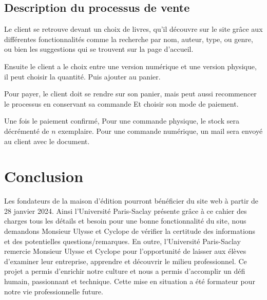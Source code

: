 \documentclass[14pt]{extarticle}
\begin{document}
\subsection{Description du processus de vente}
Le client se retrouve devant un choix de livres, qu’il découvre sur le site grâce aux différentes fonctionnalités comme la recherche par nom, auteur, type, ou genre, ou bien les suggestions qui se trouvent sur la page d’accueil.

Ensuite le client a le choix entre une version numérique et une version physique, il peut choisir la quantité. Puis ajouter au panier.

Pour payer, le client doit se rendre sur son panier, mais peut aussi recommencer le processus en conservant sa commande
Et choisir son mode de paiement.

Une fois le paiement confirmé, Pour une commande physique, le stock sera décrémenté de $n$ exemplaire. Pour une commande numérique, un mail sera envoyé au client avec le document.

\section{Conclusion}
Les fondateurs de la maison d'édition pourront bénéficier du site web à partir de 28 janvier 2024. 
Ainsi l'Université Paris-Saclay présente grâce à ce cahier des charges tous les détails et besoin pour une bonne fonctionnalité du site, nous demandons Monsieur Ulysse et Cyclope de vérifier la certitude des informations et des potentielles questions/remarques.
En outre, l'Université Paris-Saclay remercie Monsieur Ulysse et Cyclope pour l'opportunité de laisser aux élèves d'examiner leur entreprise, apprendre et découvrir le milieu professionnel. Ce projet a permis d'enrichir notre culture et nous a permis d'accomplir un défi humain, passionnant et technique. Cette mise en situation a été formateur pour notre vie professionnelle future.
\end{document}
